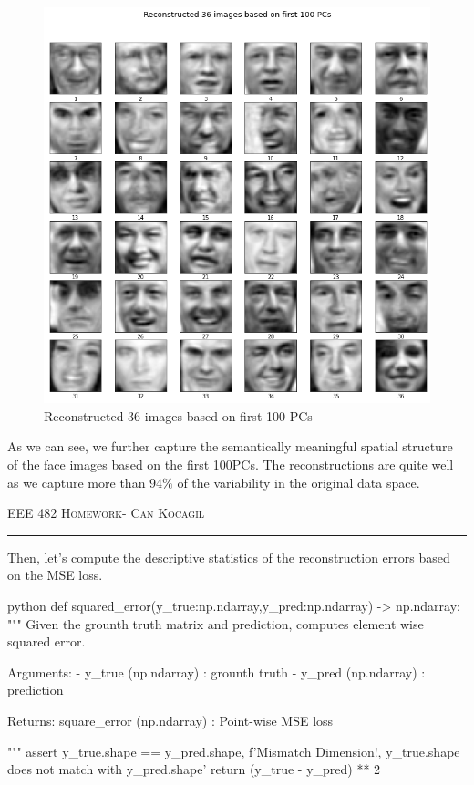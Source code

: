 \documentclass[12pt]{amsart}
\begin{document}
\begin{figure}[h]
    \centering
        \includegraphics[width = 1\textwidth]{images/Q1/Reconstructed 36 images based on first 100 PCs.png}
        \caption{Reconstructed 36 images based on first 100 PCs}
\end{figure}

As we can see, we further capture the semantically meaningful spatial structure of the face images based on the first 100PCs. The reconstructions are quite well as we capture more than $94\%$ of the variability in the original data space.

\newpage
{\scshape EEE 482} \hfill {\scshape \large  Homework-\relax} \hfill {\scshape Can Kocagil}
\smallskip
\hrule
\vspace{2mm}

Then, let's compute the descriptive statistics of the reconstruction errors based on the MSE loss.

\begin{mintedbox}{python}
def squared_error(y_true:np.ndarray,y_pred:np.ndarray) -> np.ndarray:
    """
        Given the grounth truth matrix and prediction, computes element wise squared error.
        
            
        Arguments:
            - y_true  (np.ndarray) : grounth truth
            - y_pred  (np.ndarray) : prediction
            
        Returns:
            square_error (np.ndarray) : Point-wise MSE loss
    
    """
    assert y_true.shape == y_pred.shape, f'Mismatch Dimension!, {y_true.shape} does not match with {y_pred.shape}'
    return (y_true - y_pred) ** 2
\end{mintedbox}
\end{document}

